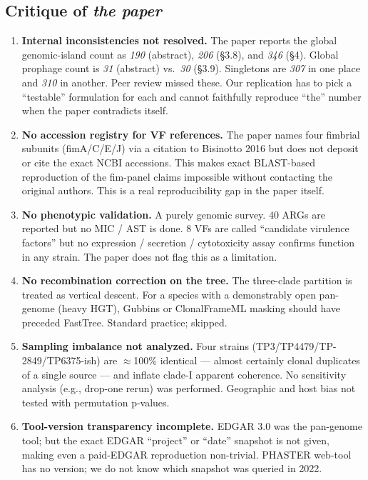 \documentclass[11pt,a4paper]{article}
\begin{document}
\subsection{Critique of \emph{the paper}}
\begin{enumerate}
\item \textbf{Internal inconsistencies not resolved.} The paper reports the global genomic-island count as \emph{190} (abstract), \emph{206} (\S 3.8), and \emph{346} (\S 4). Global prophage count is \emph{31} (abstract) vs.\ \emph{30} (\S 3.9). Singletons are \emph{307} in one place and \emph{310} in another. Peer review missed these. Our replication has to pick a ``testable'' formulation for each and cannot faithfully reproduce ``the'' number when the paper contradicts itself.
\item \textbf{No accession registry for VF references.} The paper names four fimbrial subunits (fimA/C/E/J) via a citation to Bisinotto 2016 but does not deposit or cite the exact NCBI accessions. This makes exact BLAST-based reproduction of the fim-panel claims impossible without contacting the original authors. This is a real reproducibility gap in the paper itself.
\item \textbf{No phenotypic validation.} A purely genomic survey. 40 ARGs are reported but no MIC / AST is done. 8 VFs are called ``candidate virulence factors'' but no expression / secretion / cytotoxicity assay confirms function in any strain. The paper does not flag this as a limitation.
\item \textbf{No recombination correction on the tree.} The three-clade partition is treated as vertical descent. For a species with a demonstrably open pan-genome (heavy HGT), Gubbins or ClonalFrameML masking should have preceded FastTree. Standard practice; skipped.
\item \textbf{Sampling imbalance not analyzed.} Four strains (TP3/TP4479/TP-2849/TP6375-ish) are $\approx$100\% identical --- almost certainly clonal duplicates of a single source --- and inflate clade-I apparent coherence. No sensitivity analysis (e.g., drop-one rerun) was performed. Geographic and host bias not tested with permutation p-values.
\item \textbf{Tool-version transparency incomplete.} EDGAR 3.0 was the pan-genome tool; but the exact EDGAR ``project'' or ``date'' snapshot is not given, making even a paid-EDGAR reproduction non-trivial. PHASTER web-tool has no version; we do not know which snapshot was queried in 2022.
\end{enumerate}
\end{document}
